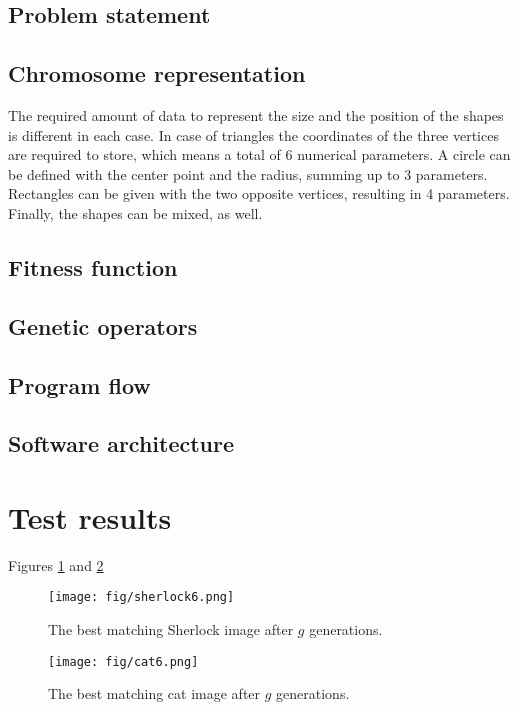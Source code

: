 \documentclass[conference]{IEEEtran}
\begin{document}
\subsection{Problem statement}


\subsection{Chromosome representation}

The required amount of data to represent the size and the position of the shapes
is different in each case. In case of triangles the coordinates of the three
vertices are required to store, which means a total of 6 numerical parameters.
A circle can be defined with the center point and the radius, summing up to 3 parameters.
Rectangles can be given with the two opposite vertices, resulting in 4 parameters.
Finally, the shapes can be mixed, as well.

\subsection{Fitness function}


\subsection{Genetic operators}


\subsection{Program flow}


\subsection{Software architecture}


\section{Test results}

Figures \ref{sherlock-6} and \ref{cat-6}

\begin{figure}[htbp]
	\centering
	\texttt{[image: fig/sherlock6.png]}
	\caption{The best matching Sherlock image after $g$ generations.}
	\label{sherlock-6}
\end{figure}

\begin{figure}[htbp]
	\centering
	\texttt{[image: fig/cat6.png]}
	\caption{The best matching cat image after $g$ generations.}
	\label{cat-6}
\end{figure}
\end{document}
